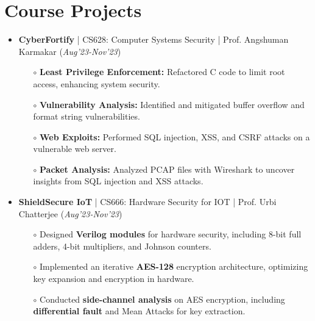 \documentclass[10.8pt, a4paper]{extarticle}
\newcommand{\shorterSection}[1]{\vspace{-10pt}\section{#1}}
\begin{document}
\shorterSection{Course Projects}
\vspace{-2pt}
\begin{itemize}

\item \textbf{CyberFortify} | CS628: Computer Systems Security | Prof. Angshuman Karmakar \href{https://github.com/vishalsavarna/CyberFortify-CS628}{\faGithub{}} \hfill(\textit{Aug'23-Nov'23})
	\\[-0.6cm]
	\begin{itemize}
	    \item[$\circ$] \textbf{Least Privilege Enforcement:} Refactored C code to limit root access, enhancing system security.\\[-0.6cm]
\item[$\circ$] \textbf{Vulnerability Analysis:} Identified and mitigated buffer overflow and format string vulnerabilities. \\[-0.6cm]
\item[$\circ$] \textbf{Web Exploits:} Performed SQL injection, XSS, and CSRF attacks on a vulnerable web server.\\[-0.6cm]

\item[$\circ$] \textbf{Packet Analysis:} Analyzed PCAP files with Wireshark to uncover insights from SQL injection and XSS attacks.\\[-0.6cm]

	\end{itemize}

  \item \textbf{ShieldSecure IoT
} | CS666: Hardware Security for IOT | Prof. Urbi Chatterjee \href{https://github.com/vishalsavarna/ShieldSecure_IoT-CS666}{\faGithub{}}  \hfill(\textit{Aug'23-Nov'23})
	\\[-0.6cm]
	\begin{itemize}
	    \item[$\circ$] Designed \textbf{Verilog modules} for hardware security, including 8-bit full adders, 4-bit multipliers, and Johnson counters.\\[-0.6cm]
\item[$\circ$] Implemented an iterative \textbf{AES-128} encryption architecture, optimizing key expansion and encryption in hardware.\\[-0.6cm]

\item[$\circ$] Conducted \textbf{side-channel analysis} on AES encryption, including \textbf{differential fault} and Mean Attacks for key extraction.\\[-0.6cm]


\end{itemize}
\end{itemize}
\end{document}
